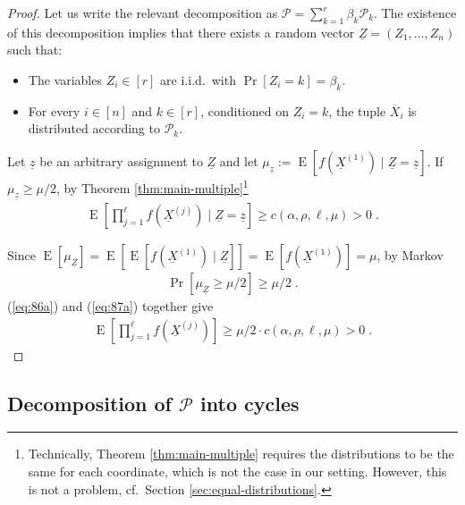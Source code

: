 \documentclass{daj}
\newcommand{\1}{\mathbbm{1}}
\theoremstyle{plain}
\theoremstyle{definition}
\DeclareMathOperator*{\EE}{E}
\newcommand{\cP}{\mathcal{P}}
\begin{document}
\begin{proof}
Let us write the relevant decomposition as $\cP = \sum_{k=1}^r \beta_k \cP_k$.
The existence of this decomposition implies that there exists a random vector
$\underline{Z} = (Z_1, \ldots, Z_n)$ such that:
\begin{itemize}
  \item The variables $Z_i \in [r]$ are i.i.d.~with $\Pr[Z_i = k] = \beta_k$.
  \item For every $i \in [n]$ and $k \in [r]$, conditioned on $Z_i = k$,
    the tuple $\overline{X}_i$ is distributed according to $\cP_k$.
\end{itemize}

Let $\underline{z}$ be an arbitrary assignment to $\underline{Z}$ and let
$\mu_{\underline{z}} := \EE[f(\underline{X}^{(1)}) \mid \underline{Z}=\underline{z}]$.
If $\mu_{\underline{z}} \ge \mu / 2$, by Theorem \ref{thm:main-multiple}\footnote{
  Technically, Theorem \ref{thm:main-multiple} requires the distributions to
be the same for each coordinate, which is not the case in our setting. However,
this is not a problem, cf.~Section \ref{sec:equal-distributions}.
}
\begin{align}
\label{eq:86a}
  \EE \left[ \prod_{j=1}^\ell f(\underline{X}^{(j)}) \mid 
  \underline{Z}=\underline{z} \right] \ge
  c(\alpha, \rho, \ell, \mu) > 0 \; .
\end{align}

Since $\EE[\mu_{\underline{Z}}] = 
\EE[\EE[f(\underline{X}^{(1)}) \mid \underline{Z}]] = 
\EE[f(\underline{X}^{(1)})] = \mu$, by Markov
\begin{align}
\label{eq:87a}
	\Pr \left[ \mu_{\underline{Z}} \ge \mu / 2 \right] \ge \mu/2 \; .
\end{align}
(\ref{eq:86a}) and (\ref{eq:87a}) together give
\begin{align*}
  \EE \left[ \prod_{j=1}^\ell f(\underline{X}^{(j)}) \right]
  \ge \mu/2 \cdot c(\alpha, \rho, \ell, \mu) > 0 \; .
\end{align*} 
\end{proof}

\subsection{Decomposition of 
\texorpdfstring{$\cP$}{P} 
into cycles}
\end{document}
